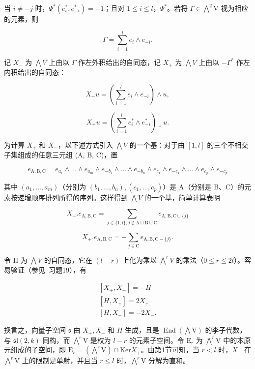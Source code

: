 当 \(i \neq -j\) 时，\(\Psi^{*}(e_{i}^{*}, e_{-i}^{*}) = -1\)；且对 \(1 \leq i \leq l\)，\(\Psi^{*}\)。若将 \(\Gamma \in \bigwedge^{2}\mathrm{V}\) 视为相应的元素，则

\[
\Gamma = \sum_ {i = 1} ^ {l} e _ {i} \wedge e _ {- i}.
\]

记 \(X_{-}\) 为 \(\bigwedge V\) 上由以 \(\Gamma\) 作左外积给出的自同态，记 \(X_{+}\) 为 \(\bigwedge V\) 上由以 \(-\Gamma^{*}\) 作左内积给出的自同态：

\[
X _ {-} u = \left(\sum_ {i = 1} ^ {l} e _ {i} \wedge e _ {- i}\right) \wedge u,
\]

\[
X _ {+} u = \left(\sum_ {i = 1} ^ {l} e _ {i} ^ {*} \wedge e _ {- i} ^ {*}\right) \lrcorner u.
\]

为计算 \(X_{+}\) 和 \(X_{-}\)，以下述方式引入 \(\bigwedge V\) 的一个基：对于由 \([1, l]\) 的三个不相交子集组成的任意三元组 (A, B, C)，置

\[
e _ {\mathrm{A,B,C}} = e _ {a _ {1}} \wedge \dots \wedge e _ {a _ {m}} \wedge e _ {- b _ {1}} \wedge \dots \wedge e _ {- b _ {n}} \wedge e _ {c _ {1}} \wedge e _ {- c _ {1}} \wedge \dots \wedge e _ {c _ {p}} \wedge e _ {- c _ {p}}
\]

其中 \((a_{1},\ldots,a_{m})\)（分别为 \((b_{1},\ldots,b_{n}),(c_{1},\ldots,c_{p})\)）是 A（分别是 B、C）的元素按递增顺序排列所得的序列。这样得到 \(\bigwedge V\) 的一个基，简单计算表明

\[
X _ {-}. e _ {\mathrm{A,B,C}} = \sum_ {j \in \{1, l \}, j \notin \mathrm{A} \cup \mathrm{B} \cup \mathrm{C}} e _ {\mathrm{A,B,C} \cup \{j \}}\tag{8}
\]

\[
X _ {+}. e _ {\mathrm{A,B,C}} = - \sum_ {j \in \mathrm{C}} e _ {\mathrm{A,B,C-} \{j \}}.\tag{9}
\]

令 H 为 \(\bigwedge V\) 的自同态，它在 \((l - r)\) 上化为乘以 \(\bigwedge^{r}V\) 的乘法（\(0 \leq r \leq 2l\)）。容易验证（参见~习题19），有

\[
\begin{array}{c} {[ X _ {+}, X _ {-} ] = - H} \\ {[ H, X _ {+} ] = 2 X _ {+}} \\ {[ H, X _ {-} ] = - 2 X _ {-}.} \end{array}
\]

换言之，向量子空间 \(\mathfrak{s}\) 由 \(X_{+}, X_{-}\) 和 \(H\) 生成，且是 \(\operatorname{End}(\bigwedge \mathrm{V})\) 的李子代数，与 \(\mathfrak{sl}(2, k)\) 同构，而 \(\bigwedge^{r} \mathrm{V}\) 是权为 \(l - r\) 的元素子空间。令 \(\mathrm{E}_{r}\) 为 \(\bigwedge^{r} \mathrm{V}\) 中的本原元组成的子空间，即 \(\mathrm{E}_{r} = (\bigwedge^{r} \mathrm{V}) \cap \mathrm{Ker} X_{+}\)。由第1节可知，当 \(r < l\) 时，\(X_{-}\) 在 \(\bigwedge^{r} \mathrm{V}\) 上的限制是单射，并且当 \(r \leq l\) 时，\(\bigwedge^{r} \mathrm{V}\) 分解为直和。

